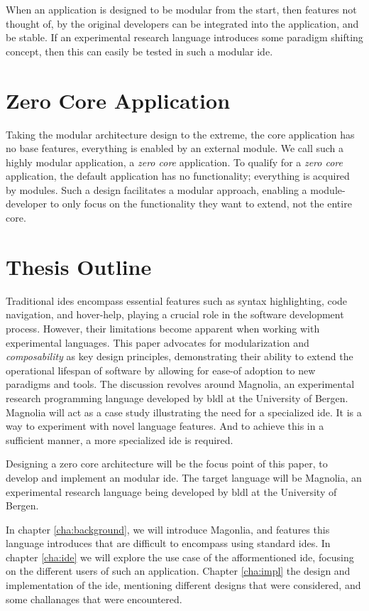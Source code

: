 \begin{hyp} \label{hyp:modular}
  When an application is designed to be modular from the start, then features
  not thought of, by the original developers can be integrated into the
  application, and be stable. If an experimental research language introduces
  some paradigm shifting concept, then this can easily be tested in such a
  modular \gls{ide}.
\end{hyp}

\section{Zero Core Application}

Taking the modular architecture design to the extreme, the core application has
no base features, everything is enabled by an external module. We call such a
highly modular application, a \textit{zero core} application. To qualify for a
\textit{zero core} application, the default application has no functionality;
everything is acquired by modules. Such a design facilitates a modular approach,
enabling a module-developer to only focus on the functionality they want to
extend, not the entire core.

\section{Thesis Outline}

Traditional \gls{ide}s encompass essential features such as syntax highlighting,
code navigation, and hover-help, playing a crucial role in the software 
development process. However, their limitations become apparent when working with
experimental languages. This paper advocates for modularization and
\textit{composability} as key design principles, demonstrating their ability to
extend the operational lifespan of software by allowing for ease-of adoption to
new paradigms and tools. The discussion revolves around Magnolia, an
experimental research programming language developed by \gls{bldl} at the
University of Bergen. Magnolia will act as a case study illustrating the need for
a specialized \gls{ide}. It is a way to experiment with novel language features.
And to achieve this in a sufficient manner, a more specialized \gls{ide} is
required.

Designing a zero core architecture will be the focus point of this paper, to
develop and implement an modular \gls{ide}. The target language will be Magnolia,
an experimental research language being developed by \gls{bldl} at the University
of Bergen.

In chapter \ref{cha:background}, we will introduce Magonlia, and features this
language introduces that are difficult to encompass using standard \gls{ide}s.
In chapter \ref{cha:ide} we will explore the use case of the afformentioned
\gls{ide}, focusing on the different users of such an application. Chapter
\ref{cha:impl} the design and implementation of the \gls{ide}, mentioning
different designs that were considered, and some challanages that were
encountered.
